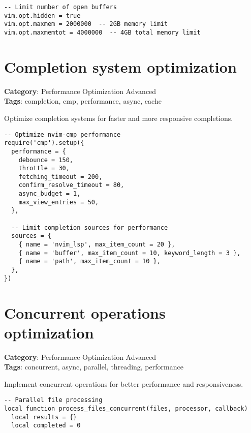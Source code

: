 {{{{{{{{{{\begin{Exa*}{}
\begin{Verbatim}[fontsize=\footnotesize, breaklines, breakanywhere]
-- Limit number of open buffers
vim.opt.hidden = true
vim.opt.maxmem = 2000000  -- 2GB memory limit
vim.opt.maxmemtot = 4000000  -- 4GB total memory limit
\end{Verbatim}
\end{Exa*}

\section{Completion system optimization}

\textbf{Category}: Performance Optimization Advanced\\ \textbf{Tags}: completion, cmp, performance, async, cache
\vspace{0.5cm}

Optimize completion systems for faster and more responsive completions.

\begin{Exa*}{}
\begin{Verbatim}[fontsize=\footnotesize, breaklines, breakanywhere]
-- Optimize nvim-cmp performance
require('cmp').setup({
  performance = {
    debounce = 150,
    throttle = 30,
    fetching_timeout = 200,
    confirm_resolve_timeout = 80,
    async_budget = 1,
    max_view_entries = 50,
  },
  
  -- Limit completion sources for performance
  sources = {
    { name = 'nvim_lsp', max_item_count = 20 },
    { name = 'buffer', max_item_count = 10, keyword_length = 3 },
    { name = 'path', max_item_count = 10 },
  },
})
\end{Verbatim}
\end{Exa*}

\section{Concurrent operations optimization}

\textbf{Category}: Performance Optimization Advanced\\ \textbf{Tags}: concurrent, async, parallel, threading, performance
\vspace{0.5cm}

Implement concurrent operations for better performance and responsiveness.

\begin{Exa*}{}
\begin{Verbatim}[fontsize=\footnotesize, breaklines, breakanywhere]
-- Parallel file processing
local function process_files_concurrent(files, processor, callback)
  local results = {}
  local completed = 0
  

\end{Verbatim}
\end{Exa*}}}}}}}}}}}
